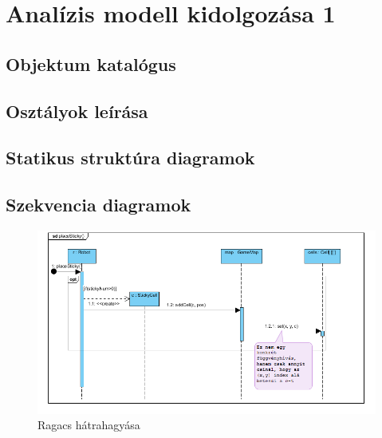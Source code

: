 %
\chapter{Analízis modell kidolgozása 1}

\thispagestyle{fancy}

\section{Objektum katalógus}





\section{Osztályok leírása}



\section{Statikus struktúra diagramok}


\clearpage

\section{Szekvencia diagramok}

\begin{figure}[!htbp]
	\begin{center}
		\includegraphics[width=178mm, center]{./chapters/chapter03/sticky.png}
		\caption{Ragacs hátrahagyása}
	\end{center}
\end{figure}

